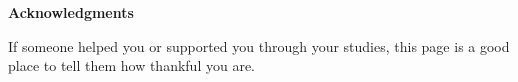\clearemptydoublepage
{}
{}

\vspace*{2cm}

\begin{center}
{\Large \textbf{Acknowledgments}}
\end{center}

\vspace{1cm}

\begin{center}
If someone helped you or supported you through your studies, this page is a
good place to tell them how thankful you are.
\end{center}
